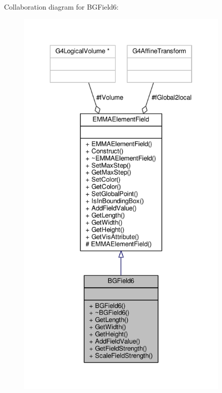 Collaboration diagram for B\+G\+Field6\+:
\nopagebreak
\begin{figure}[H]
\begin{center}
\leavevmode
\includegraphics[height=550pt]{classBGField6__coll__graph}
\end{center}
\end{figure}
